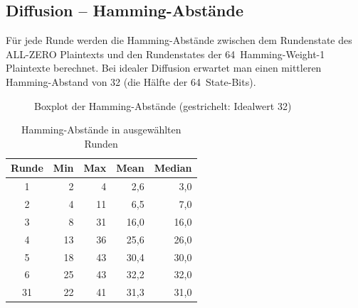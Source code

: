 \documentclass[
    fontsize=12pt,          %
    paper=a4,               %
    numbers=noenddot,       %
    listof=totoc,           %
    listof=entryprefix,     %
    listof=nochaptergap,    %
    bibliography=totoc,     %
    parskip=half,           %
    openany                 %
]{scrbook}
\begin{document}
\subsection*{Diffusion -- Hamming-Abstände}

Für jede Runde werden die Hamming-Abstände zwischen dem Rundenstate des ALL-ZERO Plaintexts und den Rundenstates der 64~Hamming-Weight-1 Plaintexte berechnet.
Bei idealer Diffusion erwartet man einen mittleren Hamming-Abstand von 32 (die Hälfte der 64~State-Bits).

\begin{figure}[H]
    \centering
    \caption{Boxplot der Hamming-Abstände (gestrichelt: Idealwert 32)}
    \label{fig:hamming}
\end{figure}

\begin{table}[H]
    \centering
    \begin{tabular}{c r r r r}
        \toprule
        \textbf{Runde} & \textbf{Min} & \textbf{Max} & \textbf{Mean} & \textbf{Median} \\
        \midrule
        1  & 2  & 4  & 2{,}6  & 3{,}0 \\
        2  & 4  & 11 & 6{,}5  & 7{,}0 \\
        3  & 8  & 31 & 16{,}0 & 16{,}0 \\
        4  & 13 & 36 & 25{,}6 & 26{,}0 \\
        5  & 18 & 43 & 30{,}4 & 30{,}0 \\
        6  & 25 & 43 & 32{,}2 & 32{,}0 \\
        \midrule
        31 & 22 & 41 & 31{,}3 & 31{,}0 \\
        \bottomrule
    \end{tabular}
    \caption{Hamming-Abstände in ausgewählten Runden}
\end{table}
\end{document}
